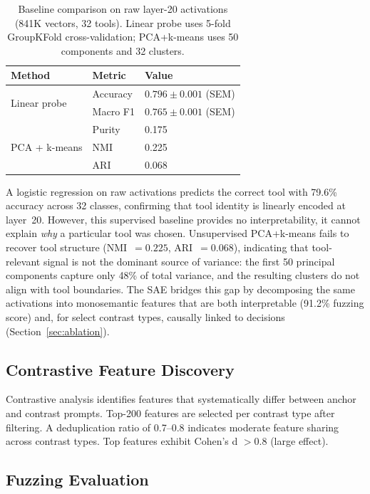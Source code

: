 \documentclass[runningheads]{llncs}
\begin{document}
\begin{table}[t]
\caption{Baseline comparison on raw layer-20 activations (841K vectors, 32 tools). Linear probe uses 5-fold GroupKFold cross-validation; PCA+k-means uses 50 components and 32 clusters.}
\label{tab:baselines}
\centering
\begin{tabular}{lll}
\toprule
Method & Metric & Value \\
\midrule
\multirow{2}{*}{Linear probe} & Accuracy & $0.796 \pm 0.001$ (SEM) \\
 & Macro F1 & $0.765 \pm 0.001$ (SEM) \\
\midrule
\multirow{3}{*}{PCA + k-means} & Purity & 0.175 \\
 & NMI & 0.225 \\
 & ARI & 0.068 \\
\bottomrule
\end{tabular}
\end{table}

A logistic regression on raw activations predicts the correct tool with 79.6\% accuracy across 32 classes, confirming that tool identity is linearly encoded at layer~20. However, this supervised baseline provides no interpretability, it cannot explain \emph{why} a particular tool was chosen. Unsupervised PCA+k-means fails to recover tool structure (NMI~$= 0.225$, ARI~$= 0.068$), indicating that tool-relevant signal is not the dominant source of variance: the first 50 principal components capture only 48\% of total variance, and the resulting clusters do not align with tool boundaries. The SAE bridges this gap by decomposing the same activations into monosemantic features that are both interpretable (91.2\% fuzzing score) and, for select contrast types, causally linked to decisions (Section~\ref{sec:ablation}).

\subsection{Contrastive Feature Discovery}

Contrastive analysis identifies features that systematically differ between anchor and contrast prompts. Top-200 features are selected per contrast type after filtering. A deduplication ratio of 0.7--0.8 indicates moderate feature sharing across contrast types. Top features exhibit Cohen's d $> 0.8$ (large effect).

\subsection{Fuzzing Evaluation}
\end{document}
